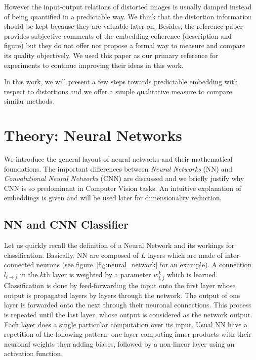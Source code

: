 \documentclass[a4paper,12pt]{report}
\begin{document}
However the input-output relations of distorted images is usually damped instead of being quantified in a predictable way.
We think that the distortion information should be kept because they are valuable later on.
Besides, the reference paper provides subjective comments of the embedding coherence (description and figure) but they do not offer nor propose a formal way to measure and compare its quality objectively.
We used this paper as our primary reference for experiments to continue improving their ideas in this work.

In this work, we will present a few steps towards predictable embedding with respect to distortions and we offer a simple qualitative measure to compare similar methods.


\chapter{Theory: Neural Networks}
\label{chap:neural_network}
We introduce the general layout of neural networks and their mathematical foundations.
The important differences between {\em Neural Networks} (NN) and {\em Convolutional Neural Networks} (CNN) are discussed and we briefly justify why CNN is so predominant in Computer Vision tasks.
An intuitive explanation of embeddings is given and will be used later for dimensionality reduction.

\section{NN and CNN Classifier}

Let us quickly recall the definition of a Neural Network and its workings for classification.
Basically, NN are composed of $L$ layers which are made of inter-connected neurons (see figure~\ref{fig:neural_network} for an example).
A connection $l_{i \rightarrow j}$ in the $k$th layer is weighted by a parameter $w^k_{i,j}$ which is learned.
Classification is done by feed-forwarding the input onto the first layer whose output is propagated layers by layers through the network.
The output of one layer is forwarded onto the next through their neuronal connections.
This process is repeated until the last layer, whose output is considered as the network output.
Each layer does a single particular computation over its input.
Usual NN have a repetition of the following pattern: one layer computing inner-products with their neuronal weights then adding biases, followed by a non-linear layer using an activation function.
\end{document}
